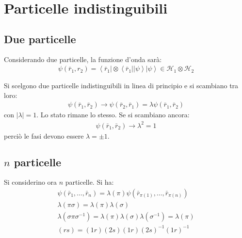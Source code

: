 \chapter{Particelle indistinguibili} %
\section{Due particelle} %
Considerando due particelle, la funzione d'onda sarà:
\begin{equation}\begin{split}
\psi \left(\bar r_1,r_2\right)=\left\langle \bar r_1\right |\otimes\left\langle \bar r_1||\psi  \right\rangle\left |\psi  \right\rangle\in \mathcal{H}_1\otimes\mathcal{H}_2
\end{split}\end{equation}

Si scelgono due particelle indistinguibili in linea di principio e si scambiano tra loro:
\begin{equation}\begin{split}
\psi \left(\bar r_1,\bar r_2\right)\rightarrow \psi \left(\bar r_2,\bar r_1\right)=\lambda\psi \left(\bar r_1,\bar r_2\right)
\end{split}\end{equation}
con $|\lambda |=1$. Lo stato rimane lo stesso. Se si scambiano ancora:
\begin{equation}\begin{split}
\psi \left(\bar r_1,\bar r_2\right) \rightarrow \lambda^2=1
\end{split}\end{equation}
perciò le fasi devono essere $\lambda=\pm 1$.

\section{$n$ particelle} %
Si considerino ora $n$ particelle. Si ha:
\begin{equation}\begin{split}
\psi \left(\bar r_1,\dots,\bar r_n\right)=\lambda\left(\pi\right)\psi \left(\bar r_{\pi\left(1\right)},\dots,\bar r_{\pi\left(n\right)}\right) \\
\lambda\left(\pi\sigma\right)=\lambda\left(\pi\right)\lambda\left(\sigma\right) \\
\lambda\left(\sigma\pi\sigma^{-1}\right)=\lambda\left(\pi\right)\lambda\left(\sigma\right)\lambda\left(\sigma^{-1}\right)=\lambda\left(\pi\right) \\
\left(rs\right)=\left(1r\right)\left(2s\right)\left(1r\right)\left(2s\right)^{-1}\left(1r\right)^{-1}
\end{split}\end{equation}

